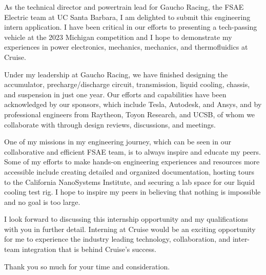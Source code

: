 \documentclass[11pt, letterpaper]{awesome-cv} %
\begin{document}
\makecvheader %

\makelettertitle %


\begin{cvletter}

As the technical director and powertrain lead for Gaucho Racing, the FSAE Electric team at UC Santa Barbara, I am delighted to submit this engineering intern application. I have been critical in our efforts to presenting a tech-passing vehicle at the 2023 Michigan competition and I hope to demonstrate my experiences in power electronics, mechanics, mechanics, and thermofluidics at Cruise. 

Under my leadership at Gaucho Racing, we have finished designing the accumulator, precharge/discharge circuit, transmission, liquid cooling, chassis, and suspension in just one year. Our efforts and capabilities have been acknowledged by our sponsors, which include Tesla, Autodesk, and Ansys, and by professional engineers from Raytheon, Toyon Research, and UCSB, of whom we collaborate with through design reviews, discussions, and meetings. 

One of my missions in my engineering journey, which can be seen in our collaborative and efficient FSAE team, is to always inspire and educate my peers. Some of my efforts to make hands-on engineering experiences and resources more accessible include creating detailed and organized documentation, hosting tours to the California NanoSystems Institute, and securing a lab space for our liquid cooling test rig. I hope to inspire my peers in believing that nothing is impossible and no goal is too large.

I look forward to discussing this internship opportunity and my qualifications with you in further detail. Interning at Cruise would be an exciting opportunity for me to experience the industry leading technology, collaboration, and inter-team integration that is behind Cruise's success. 

Thank you so much for your time and consideration.



\end{cvletter}


\makeletterclosing %
\end{document}
